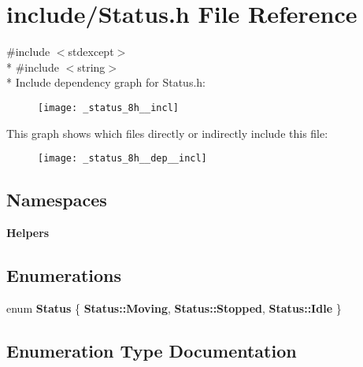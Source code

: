 \section{include/\+Status.h File Reference}
\label{_status_8h}
{\ttfamily \#include $<$stdexcept$>$}\\*
{\ttfamily \#include $<$string$>$}\\*
Include dependency graph for Status.\+h\+:
\nopagebreak
\begin{figure}[H]
\begin{center}
\leavevmode
\texttt{[image: \_status\_8h\_\_incl]}
\end{center}
\end{figure}
This graph shows which files directly or indirectly include this file\+:
\nopagebreak
\begin{figure}[H]
\begin{center}
\leavevmode
\texttt{[image: \_status\_8h\_\_dep\_\_incl]}
\end{center}
\end{figure}
\subsection*{Namespaces}
\begin{DoxyCompactItemize}
\item 
 {\bf Helpers}
\end{DoxyCompactItemize}
\subsection*{Enumerations}
\begin{DoxyCompactItemize}
\item 
enum {\bf Status} \{ {\bf Status\+::\+Moving}, 
{\bf Status\+::\+Stopped}, 
{\bf Status\+::\+Idle}
 \}
\end{DoxyCompactItemize}


\subsection{Enumeration Type Documentation}
